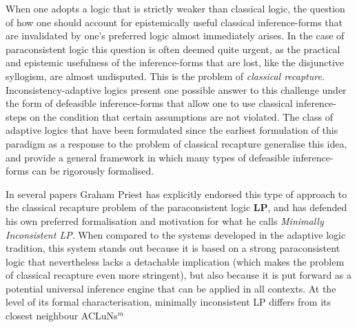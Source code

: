 \documentclass[]{article}
\newtheorem{definition}{Definition}
\newcommand{\TurnADND}[2]
    { {#1}\vdash_{\textbf{\sf AdaptiveND}}  {#2}}
\newcommand{\TurnChecked}[2]
    { {#1}\vdash_{\textbf{\sf \checked}}  {#2}}
\begin{document}
When one adopts a logic that is strictly weaker than classical logic, the question of how one should account for epistemically useful classical inference-forms that are invalidated by one's preferred logic almost immediately arises. In the case of paraconsistent logic this question is often deemed quite urgent, as the practical and epistemic usefulness of the inference-forms that are lost, like the disjunctive syllogism, are almost undisputed. This is the problem of \emph{classical recapture}. Inconsistency-adaptive logics present one possible answer to this challenge under the form of defeasible inference-forms that allow one to use classical inference-steps on the condition that certain assumptions are not violated. The class of adaptive logics that have been formulated since the earliest formulation of this paradigm as a response to the problem of classical recapture generalise this idea, and provide a general framework in which many types of defeasible inference-forms can be rigorously formalised.

In several papers Graham Priest has explicitly endorsed this type of approach to the classical recapture problem of the paraconsistent logic \textbf{LP}, and has defended his own preferred formalisation and motivation for what he calls \emph{Minimally Inconsistent LP}. When compared to the systems developed in the adaptive logic tradition, this system stands out because it is based on a strong paraconsistent logic that nevertheless lacks a detachable implication (which makes the problem of classical recapture even more stringent), but also because it is put forward as a potential universal inference engine that can be applied in all contexts. At the level of its formal characterisation, minimally inconsistent LP differs from its closest neighbour ACLuNs$^m$ 

%
\end{document}
